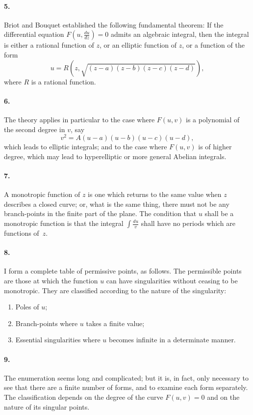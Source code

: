 \documentclass[11pt,a4paper]{article}
\theoremstyle{definition}
\begin{document}
\paragraph{5.} Briot and Bouquet established the following fundamental theorem: If the differential equation $F(u, \frac{du}{dz}) = 0$ admits an algebraic integral, then the integral is either a rational function of $z$, or an elliptic function of $z$, or a function of the form
\[
u = R(z, \sqrt{(z - a)(z - b)(z - c)(z - d)}),
\]
where $R$ is a rational function.

\paragraph{6.} The theory applies in particular to the case where $F(u, v)$ is a polynomial of the second degree in $v$, say
\[
v^{2} = A(u - a)(u - b)(u - c)(u - d),
\]
which leads to elliptic integrals; and to the case where $F(u, v)$ is of higher degree, which may lead to hyperelliptic or more general Abelian integrals.

\paragraph{7.} A monotropic function of $z$ is one which returns to the same value when $z$ describes a closed curve; or, what is the same thing, there must not be any branch-points in the finite part of the plane. The condition that $u$ shall be a monotropic function is that the integral $\int \frac{du}{v}$ shall have no periods which are functions of~$z$.

\paragraph{8.} I form a complete table of permissive points, as follows. The permissible points are those at which the function $u$ can have singularities without ceasing to be monotropic. They are classified according to the nature of the singularity:
\begin{enumerate}[label=(\alph*)]
\item Poles of $u$;
\item Branch-points where $u$ takes a finite value;
\item Essential singularities where $u$ becomes infinite in a determinate manner.
\end{enumerate}

\paragraph{9.} The enumeration seems long and complicated; but it is, in fact, only necessary to see that there are a finite number of forms, and to examine each form separately. The classification depends on the degree of the curve $F(u, v) = 0$ and on the nature of its singular points.
\end{document}
